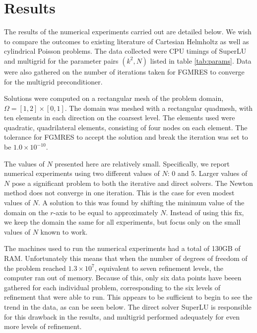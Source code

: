 \chapter{Results}

\def\figwidth{0.7\columnwidth}

\def \mgcol {red}
\def \lucol {black}

\def \helmholtzfolder {data/output_k_100_n_5}
\def \poissonfolder {data/output_k_0_n_5}
\def \axisymmpoisson {data/output_k_0_n_0}
\def \axisymhelmholtz {data/output_k_10_n_0}



The results of the numerical experiments carried out are detailed below.
We wish to compare the outcomes to existing literature of Cartesian Helmholtz as well as cylindrical Poisson problems.
The data collected were CPU timings of SuperLU and multigrid for the parameter pairs $(k^2,N)$ listed in table \ref{tab:params}.
Data were also gathered on the number of iterations taken for FGMRES to converge for the multigrid preconditioner.

Solutions were computed on a rectangular mesh of the problem domain, $\Omega = [1,2] \times [0,1]$.
The domain was meshed with a rectangular quadmesh, with ten elements in each direction on the coarsest level.
The elements used were quadratic, quadrilateral elements, consisting of four nodes on each element.
The tolerance for FGMRES to accept the solution and break the iteration was set to be $1.0\times 10^{-10}$.

The values of $N$ presented here are relatively small.
Specifically, we report numerical experiments using two different values of $N$: 0 and 5.
Larger values of $N$ pose a significant problem to both the iterative and direct solvers.
The Newton method does not converge in one iteration.
This is the case for even modest values of $N$.
A solution to this was found by shifting the minimum value of the domain on the $r$-axis to be equal to approximately $N$.
Instead of using this fix, we keep the domain the same for all experiments, but focus only on the small values of $N$ known to work.

The machines used to run the numerical experiments had a total of 130GB of RAM.
Unfortunately this means that when the number of degrees of freedom of the problem reached $1.3\times 10^7$, equivalent to seven refinement levels, the computer ran out of memory.
Because of this, only six data points have beeen gathered for each individual problem, corresponding to the six levels of refinement that were able to run.
This appears to be sufficient to begin to see the trend in the data, as can be seen below.
The direct solver SuperLU is responsible for this drawback in the results, and multigrid performed adequately for even more levels of refinement.


